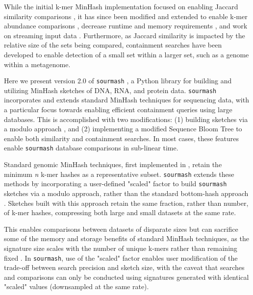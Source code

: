 \documentclass[10pt,a4paper,twocolumn]{article}
\begin{document}
While the initial k-mer MinHash implementation focused on enabling Jaccard similarity comparisons \cite{ondov2016mash}, it has since been modified and extended to enable k-mer abundance comparisons \cite{boveefinch}, decrease runtime and memory requirements \cite{zhao2018bindash}, and work on streaming input data \cite{rowe2018streaming}. Furthermore, as Jaccard similarity is impacted by the relative size of the sets being compared, containment searches \cite{broder1997resemblance, Koslicki184150, mash_screen} have been developed to enable detection of a small set within a larger set, such as a genome within a metagenome.

Here we present version 2.0 of \lstinline{sourmash} \cite{brown2016sourmash}, a Python library for building and utilizing MinHash sketches of DNA, RNA, and protein data. \lstinline{sourmash} incorporates and extends standard MinHash techniques for sequencing data, with a particular focus towards enabling efficient containment queries using large databases. This is accomplished with two modifications: (1) building sketches via a modulo approach \cite{broder1997resemblance}, and (2) implementing a modified Sequence Bloom Tree \cite{solomon2016fast} to enable both similarity and containment searches. In most cases, these features enable \lstinline{sourmash} database comparisons in sub-linear time.

Standard genomic MinHash techniques, first implemented in \cite{ondov2016mash}, retain the minimum \textit{n} k-mer hashes as a representative subset. \lstinline{sourmash} extends these methods by incorporating a user-defined "scaled" factor to build \lstinline{sourmash} sketches via a modulo approach, rather than the standard bottom-hash approach \cite{broder1997resemblance}. Sketches built with this approach retain the same fraction, rather than number, of k-mer hashes, compressing both large and small datasets at the same rate. 

This enables comparisons between datasets of disparate sizes but can sacrifice some of the memory and storage benefits of standard MinHash techniques, as the signature size scales with the number of unique k-mers rather than remaining fixed \cite{mash_screen}. In \lstinline{sourmash}, use of the "scaled" factor enables user modification of the trade-off between search precision and sketch size, with the caveat that searches and comparisons can only be conducted using signatures generated with identical "scaled" values (downsampled at the same rate). 
\end{document}
